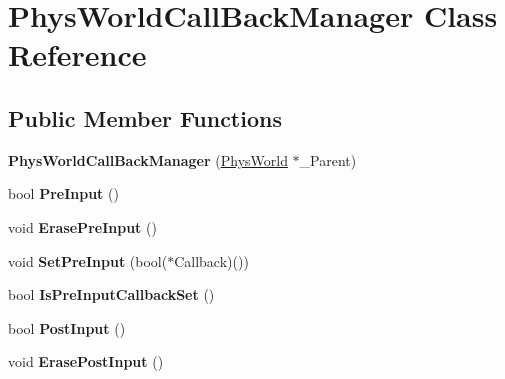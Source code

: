 \hypertarget{classPhysWorldCallBackManager}{
\section{PhysWorldCallBackManager Class Reference}
\label{d4/d84/classPhysWorldCallBackManager}
}
\subsection*{Public Member Functions}
\begin{DoxyCompactItemize}
\item 
\hypertarget{classPhysWorldCallBackManager_a8c9c48f5f38894c992a7d9b305511fc5}{
{\bfseries PhysWorldCallBackManager} (\hyperlink{classPhysWorld}{PhysWorld} $\ast$\_\-Parent)}
\label{d4/d84/classPhysWorldCallBackManager_a8c9c48f5f38894c992a7d9b305511fc5}

\item 
\hypertarget{classPhysWorldCallBackManager_a10f1f1f43901a1f9abd81894c88adde1}{
bool {\bfseries PreInput} ()}
\label{d4/d84/classPhysWorldCallBackManager_a10f1f1f43901a1f9abd81894c88adde1}

\item 
\hypertarget{classPhysWorldCallBackManager_ade91162294b133a884d3cd3738837188}{
void {\bfseries ErasePreInput} ()}
\label{d4/d84/classPhysWorldCallBackManager_ade91162294b133a884d3cd3738837188}

\item 
\hypertarget{classPhysWorldCallBackManager_a7c998a308fa8ad1a32fdbf6418d5a996}{
void {\bfseries SetPreInput} (bool($\ast$Callback)())}
\label{d4/d84/classPhysWorldCallBackManager_a7c998a308fa8ad1a32fdbf6418d5a996}

\item 
\hypertarget{classPhysWorldCallBackManager_a1915942a4ed70cff4f445ce39df1f4ad}{
bool {\bfseries IsPreInputCallbackSet} ()}
\label{d4/d84/classPhysWorldCallBackManager_a1915942a4ed70cff4f445ce39df1f4ad}

\item 
\hypertarget{classPhysWorldCallBackManager_a3a404104057c820322d785a1b32f6e98}{
bool {\bfseries PostInput} ()}
\label{d4/d84/classPhysWorldCallBackManager_a3a404104057c820322d785a1b32f6e98}

\item 
\hypertarget{classPhysWorldCallBackManager_a42b58aecec23dca37414f220cd9abdef}{
void {\bfseries ErasePostInput} ()}
\label{d4/d84/classPhysWorldCallBackManager_a42b58aecec23dca37414f220cd9abdef}


\end{DoxyCompactItemize}
